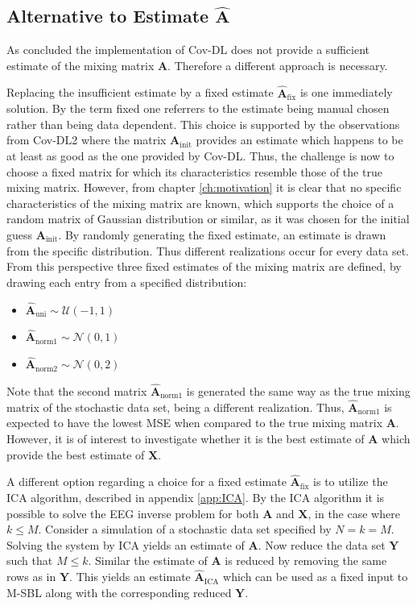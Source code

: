 \subsection{Alternative to Estimate $\hat{\textbf{A}}$}  
As concluded the implementation of Cov-DL does not provide a sufficient estimate of the mixing matrix $\mathbf{A}$. 
Therefore a different approach is necessary. 

Replacing the insufficient estimate by a fixed estimate $\hat{\mathbf{A}}_{\text{fix}}$ is one immediately solution. By the term fixed one referrers to the estimate being manual chosen rather than being data dependent.  
This choice is supported by the observations from Cov-DL2 where the matrix $\mathbf{A}_{\text{init}}$ provides an estimate which happens to be at least as good as the one provided by Cov-DL. 
Thus, the challenge is now to choose a fixed matrix for which its characteristics resemble those of the true mixing matrix. 
However, from chapter \ref{ch:motivation} it is clear that no specific characteristics of the mixing matrix are known, which supports the choice of a random matrix of Gaussian distribution or similar, as it was chosen for the initial guess $\mathbf{A}_{\text{init}}$.
By randomly generating the fixed estimate, an estimate is drawn from the specific distribution. Thus different realizations occur for every data set.    
From this perspective three fixed estimates of the mixing matrix are defined, by drawing each entry from a specified distribution: 
\begin{itemize}
\item[] $\hat{\mathbf{A}}_{\text{uni}} \sim \mathcal{U}(-1,1)$
\item[] $\hat{\mathbf{A}}_{\text{norm1}} \sim \mathcal{N}(0,1)$                                           
\item[] $\hat{\mathbf{A}}_{\text{norm2}} \sim \mathcal{N}(0,2)$ 
\end{itemize}
Note that the second matrix $\hat{\mathbf{A}}_{\text{norm1}}$ is generated the same way as the true mixing matrix of the stochastic data set, being a different realization. 
Thus, $\hat{\mathbf{A}}_{\text{norm1}}$ is expected to have the lowest MSE when compared to the true mixing matrix $\mathbf{A}$. 
However, it is of interest to investigate whether it is the best estimate of $\mathbf{A}$ which provide the best estimate of $\mathbf{X}$. 

A different option regarding a choice for a fixed estimate $\hat{\mathbf{A}}_{\text{fix}}$ is to utilize the ICA algorithm, described in appendix \ref{app:ICA}. 
By the ICA algorithm it is possible to solve the EEG inverse problem for both $\mathbf{A}$ and $\mathbf{X}$, in the case where $k \leq M$.
Consider a simulation of a stochastic data set specified by $N = k = M$. 
Solving the system by ICA yields an estimate of $\mathbf{A}$. 
Now reduce the data set $\mathbf{Y}$ such that $M \leq k$. 
Similar the estimate of $\mathbf{A}$ is reduced by removing the same rows as in $\mathbf{Y}$. 
This yields an estimate $\hat{\mathbf{A}}_{\text{ICA}}$ which can be used as a fixed input to M-SBL along with the corresponding reduced $\mathbf{Y}$.

